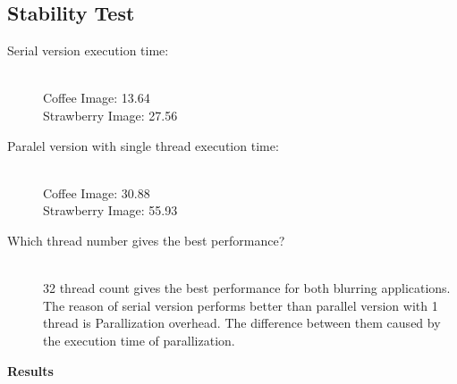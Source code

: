 \documentclass{article}
\begin{document}
\newpage
\subsection{Stability Test}

\begin{description}
    \item[Serial version execution time: ] \hfill \\ 
    Coffee Image: 13.64\\
    Strawberry Image: 27.56\\
    \item[Paralel version with single thread execution time: ] \hfill \\
    Coffee Image: 30.88\\
    Strawberry Image: 55.93\\
    \item[Which thread number gives the best performance?] \hfill \\
    32 thread count gives the best performance for both blurring applications.
    \\
    The reason of serial version performs better than parallel version with 1 thread is Parallization overhead.
    The difference between them caused by the execution time of parallization.
\end{description}

\textbf{Results}
\end{document}
